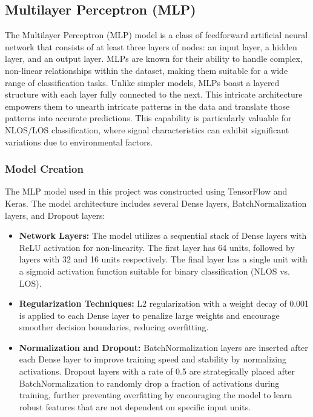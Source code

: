 \documentclass[
	article, %
	11pt, %
	draft, %
]{CSUniSchoolLabReport}
\begin{document}
\subsection{Multilayer Perceptron (MLP)}\label{mlp}                                                                                 
The Multilayer Perceptron (MLP) model is a class of feedforward artificial neural network that consists of at least three layers of nodes: an input layer, a hidden layer, and an output layer. MLPs are known for their ability to handle complex, non-linear relationships within the dataset, making them suitable for a wide range of classification tasks. Unlike simpler models, MLPs boast a layered structure with each layer fully connected to the next. This intricate architecture empowers them to unearth intricate patterns in the data and translate those patterns into accurate predictions. This capability is particularly valuable for NLOS/LOS classification, where signal characteristics can exhibit significant variations due to environmental factors.

\subsubsection{Model Creation}

The MLP model used in this project was constructed using TensorFlow and Keras. The model architecture includes several Dense layers, BatchNormalization layers, and Dropout layers:

\begin{itemize}
    \item \textbf{Network Layers:} The model utilizes a sequential stack of Dense layers with ReLU activation for non-linearity. The first layer has 64 units, followed by layers with 32 and 16 units respectively. The final layer has a single unit with a sigmoid activation function suitable for binary classification (NLOS vs. LOS).
    \item \textbf{Regularization Techniques:} L2 regularization with a weight decay of 0.001 is applied to each Dense layer to penalize large weights and encourage smoother decision boundaries, reducing overfitting.
    \item \textbf{Normalization and Dropout:} BatchNormalization layers are inserted after each Dense layer to improve training speed and stability by normalizing activations. Dropout layers with a rate of 0.5 are strategically placed after BatchNormalization to randomly drop a fraction of activations during training, further preventing overfitting by encouraging the model to learn robust features that are not dependent on specific input units.
\end{itemize}
\end{document}
